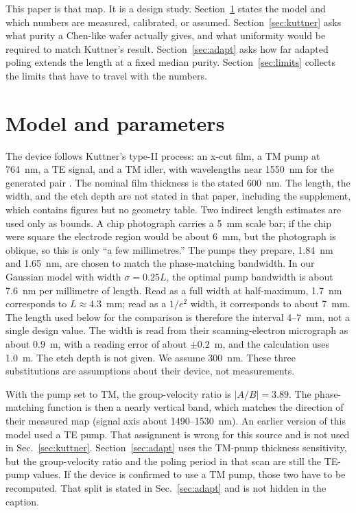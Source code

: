 \documentclass[11pt,a4paper]{article}
\begin{document}
This paper is that map.
It is a design study.
Section~\ref{sec:model} states the model and which numbers are measured, calibrated, or assumed.
Section~\ref{sec:kuttner} asks what purity a Chen-like wafer actually gives, and what uniformity would be required to match Kuttner's result.
Section~\ref{sec:adapt} asks how far adapted poling extends the length at a fixed median purity.
Section~\ref{sec:limits} collects the limits that have to travel with the numbers.

\section{Model and parameters}
\label{sec:model}
The device follows Kuttner's type-II process: an x-cut film, a TM pump at 764~nm, a TE signal, and a TM idler, with wavelengths near 1550~nm for the generated pair \cite{Kuttner2026}.
The nominal film thickness is the stated 600~nm.
The length, the width, and the etch depth are not stated in that paper, including the supplement, which contains figures but no geometry table.
Two indirect length estimates are used only as bounds.
A chip photograph carries a 5~mm scale bar; if the chip were square the electrode region would be about 6~mm, but the photograph is oblique, so this is only ``a few millimetres.''
The pumps they prepare, 1.84~nm and 1.65~nm, are chosen to match the phase-matching bandwidth.
In our Gaussian model with width $\sigma=0.25L$, the optimal pump bandwidth is about 7.6~nm per millimetre of length.
Read as a full width at half-maximum, 1.7~nm corresponds to $L\approx 4.3$~mm; read as a $1/e^{2}$ width, it corresponds to about 7~mm.
The length used below for the comparison is therefore the interval 4--7~mm, not a single design value.
The width is read from their scanning-electron micrograph as about 0.9~\textmu m, with a reading error of about $\pm 0.2$~\textmu m, and the calculation uses 1.0~\textmu m.
The etch depth is not given.
We assume 300~nm.
These three substitutions are assumptions about their device, not measurements.

With the pump set to TM, the group-velocity ratio is $|A/B|=3.89$.
The phase-matching function is then a nearly vertical band, which matches the direction of their measured map (signal axis about 1490--1530~nm).
An earlier version of this model used a TE pump.
That assignment is wrong for this source and is not used in Sec.~\ref{sec:kuttner}.
Section~\ref{sec:adapt} uses the TM-pump thickness sensitivity, but the group-velocity ratio and the poling period in that scan are still the TE-pump values.
If the device is confirmed to use a TM pump, those two have to be recomputed.
That split is stated in Sec.~\ref{sec:adapt} and is not hidden in the caption.
\end{document}
